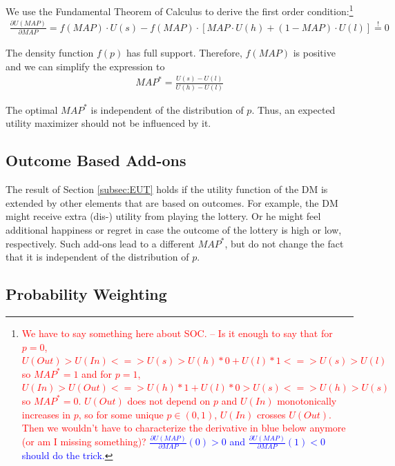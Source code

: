 We use the Fundamental Theorem of Calculus to derive the first order condition:\footnote{
\textcolor{red}{We have to say something here about SOC. -- Is it enough to say that for $p=0$, $U(Out)>U(In) <=> U(s)>U(h)*0+U(l)*1 <=> U(s)>U(l)$ so $MAP^*=1$ and for $p=1$, $U(In)>U(Out) <=> U(h)*1+U(l)*0>U(s) <=> U(h)>U(s)$ so $MAP^*=0$. $U(Out)$ does not depend on $p$ and $U(In)$ monotonically increases in $p$, so for some unique $p \in (0,1)$, $U(In)$ crosses $U(Out)$. Then we wouldn't have to characterize the derivative in blue below anymore (or am I missing something)?}
\textcolor{blue}{$\frac{\partial U(MAP)}{\partial MAP} (0) > 0 $ and $\frac{\partial U(MAP)}{\partial MAP} (1) < 0$ should do the trick.}}
\begin{align}
	\frac{\partial U(MAP)}{\partial MAP} %
	= f(MAP) \cdot U(s) - f(MAP) \cdot \left[MAP \cdot U(h) + (1-MAP) \cdot U(l) \right] \stackrel{!}{=} 0
\end{align}

The density function $f(p)$ has full support.
Therefore, $f(MAP)$ is positive and we can simplify the expression to 
\begin{align}
	MAP^* = \frac{U(s)-U(l)}{U(h)-U(l)}
\end{align}

The optimal $MAP^*$ is independent of the distribution of $p$.
Thus, an expected utility maximizer should not be influenced by it. 


\subsection{Outcome Based Add-ons}

The result of Section \ref{subsec:EUT} holds if the utility function of the DM is extended by other elements that are based on outcomes.
For example, the DM might receive extra \mbox{(dis-)} utility from playing the lottery.
Or he might feel additional happiness or regret in case the outcome of the lottery is high or low, respectively.
Such add-ons lead to a different $MAP^*$, but do not change the fact that it is independent of the distribution of $p$.  


\subsection{Probability Weighting}

